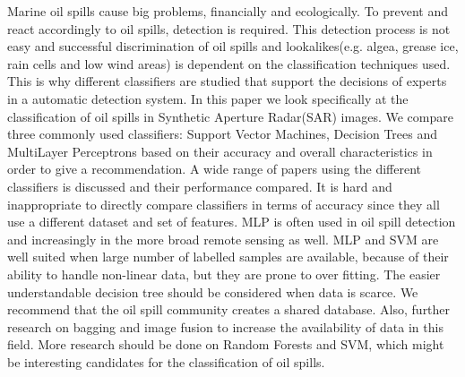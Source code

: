 Marine oil spills cause big problems, financially and ecologically. To prevent and react accordingly to oil spills, detection is required. This detection process is not easy and successful discrimination of oil spills and lookalikes(e.g. algea, grease ice, rain cells and low wind areas) is dependent on the classification techniques used. This is why different classifiers are studied that support the decisions of experts in a automatic detection system. In this paper we look specifically at the classification of oil spills in Synthetic Aperture Radar(SAR) images. We compare three commonly used classifiers: Support Vector Machines, Decision Trees and MultiLayer Perceptrons based on their accuracy and overall characteristics in order to give a recommendation. A wide range of papers using the different classifiers is discussed and their performance compared. It is hard and inappropriate to directly compare classifiers in terms of accuracy since they all use a different dataset and set of features. MLP is often used in oil spill detection and increasingly in the more broad remote sensing as well. MLP and SVM are well suited when large number of labelled samples are available, because of their ability to handle non-linear data, but they are prone to over fitting. The easier understandable decision tree should be considered when data is scarce. We recommend that the oil spill community creates a shared database. Also, further research on bagging and image fusion to increase the availability of data in this field. More research should be done on Random Forests and SVM, which might be interesting candidates for the classification of oil spills.
